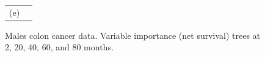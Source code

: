 \documentclass[12pt]{article}
\begin{document}
\begin{figure}
\begin{tabular}{cc}
   (e) 
\end{tabular}
\caption{ Males colon cancer data. Variable importance (net survival) trees at 2, 20, 40, 60, and 80 months.}
\label{fig:tree_males}
\end{figure}




\end{document}
